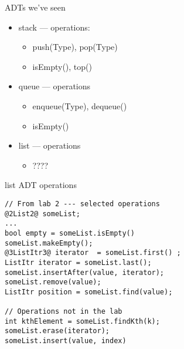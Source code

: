 \begin{frame}[fragile,label=stackAdtOps]{ADTs we've seen}
    \begin{itemize}
    \item stack --- operations:
        \begin{itemize}
        \item push(Type), pop(Type)
        \item isEmpty(), top()
        \end{itemize}
    \item queue --- operations
        \begin{itemize}
        \item enqueue(Type), dequeue()
        \item isEmpty()
        \end{itemize}
    \item list  --- operations
        \begin{itemize}
        \item ????
        \end{itemize}
    \end{itemize}
\end{frame}

\begin{frame}[fragile,label=listAdt]{list ADT operations}
\begin{lstlisting}
// From lab 2 --- selected operations
@2List2@ someList;
...
bool empty = someList.isEmpty()
someList.makeEmpty();
@3ListItr3@ iterator  = someList.first() ;
ListItr iterator = someList.last();
someList.insertAfter(value, iterator);
someList.remove(value);
ListItr position = someList.find(value);

// Operations not in the lab
int kthElement = someList.findKth(k);
someList.erase(iterator);
someList.insert(value, index)
\end{lstlisting}
\end{frame}

